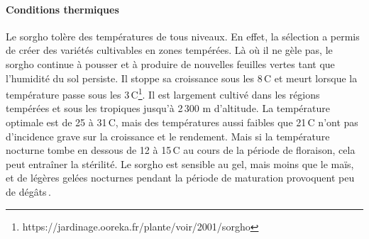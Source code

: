 \documentclass[a4paper,11pt]{article}
\begin{document}
\paragraph{Conditions thermiques} Le sorgho tolère des températures de
tous niveaux. En effet, la sélection a permis de créer des variétés
cultivables en zones tempérées. Là où il ne gèle pas, le sorgho
continue à pousser et à produire de nouvelles feuilles vertes tant que
l'humidité du sol persiste. Il stoppe sa croissance sous les
8\,\degree{}C et meurt lorsque la température passe sous les
3\,\degree{}C\footnote{https://jardinage.ooreka.fr/plante/voir/2001/sorgho}. Il
est largement cultivé dans les régions tempérées et sous les tropiques
jusqu'à 2\,300 m d'altitude. La température optimale est de 25 à
31\,\degree{}C, mais des températures aussi faibles que 21\,\degree{}C
n'ont pas d'incidence grave sur la croissance et le rendement. Mais si
la température nocturne tombe en dessous de 12 à 15\,\degree{}C au
cours de la période de floraison, cela peut entraîner la stérilité. Le
sorgho est sensible au gel, mais moins que le maïs, et de légères
gelées nocturnes pendant la période de maturation provoquent peu de
dégâts\,\cite{BARRO_KONDOMBO_2010}.
\end{document}
